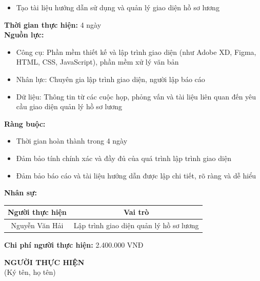 {\begin{minipage}{\textwidth}
\begin{itemize}
        \item Tạo tài liệu hướng dẫn sử dụng và quản lý giao diện hồ sơ lương
    \end{itemize}
    \vspace{0.5cm}
    \noindent \textbf{Thời gian thực hiện:} 4 ngày \\
    \noindent \textbf{Nguồn lực:}
    \begin{itemize}
        \item Công cụ: Phần mềm thiết kế và lập trình giao diện (như Adobe XD, Figma, HTML, CSS, JavaScript), phần mềm xử lý văn bản
        \item Nhân lực: Chuyên gia lập trình giao diện, người lập báo cáo
        \item Dữ liệu: Thông tin từ các cuộc họp, phỏng vấn và tài liệu liên quan đến yêu cầu giao diện quản lý hồ sơ lương
    \end{itemize}
    \vspace{0.5cm}
    \noindent \textbf{Ràng buộc:}
    \begin{itemize}
        \item Thời gian hoàn thành trong 4 ngày
        \item Đảm bảo tính chính xác và đầy đủ của quá trình lập trình giao diện
        \item Đảm bảo báo cáo và tài liệu hướng dẫn được lập chi tiết, rõ ràng và dễ hiểu
    \end{itemize}
    \vspace{0.5cm}
    \noindent \textbf{Nhân sự:}
    \begin{longtable}{|c|c|}
    \hline
    \textbf{Người thực hiện} & \textbf{Vai trò} \\
    \hline
    Nguyễn Văn Hải & Lập trình giao diện quản lý hồ sơ lương \\
    \hline
    \end{longtable}
    \vspace{0.5cm}
    \noindent \textbf{Chi phí người thực hiện:} 2.400.000 VNĐ \\
    \vspace{1cm}
    \begin{flushleft}
        \hspace{8cm} \textbf{NGƯỜI THỰC HIỆN} \\
        \hspace{8.8cm} (Ký tên, họ tên) \\
        \vspace{1cm}
    \end{flushleft}
    \end{minipage}
}
% 
